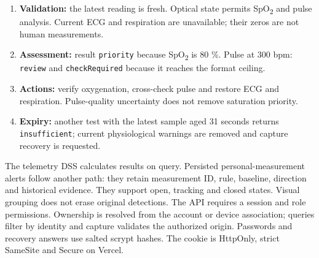 \begin{enumerate}[leftmargin=5mm,itemsep=5pt]
\item \textbf{Validation:} the latest reading is fresh. Optical state permits SpO\textsubscript{2} and pulse analysis. Current ECG and respiration are unavailable; their zeros are not human measurements.
\item \textbf{Assessment:} result \texttt{priority} because SpO\textsubscript{2} is 80 \%. Pulse at 300 bpm: \texttt{review} and \texttt{checkRequired} because it reaches the format ceiling.
\item \textbf{Actions:} verify oxygenation, cross-check pulse and restore ECG and respiration. Pulse-quality uncertainty does not remove saturation priority.
\item \textbf{Expiry:} another test with the latest sample aged 31 seconds returns \texttt{insufficient}; current physiological warnings are removed and capture recovery is requested.
\end{enumerate}
The telemetry DSS calculates results on query. Persisted personal-measurement alerts follow another path: they retain measurement ID, rule, baseline, direction and historical evidence. They support open, tracking and closed states. Visual grouping does not erase original detections.
The API requires a session and role permissions. Ownership is resolved from the account or device association; queries filter by identity and capture validates the authorized origin. Passwords and recovery answers use salted scrypt hashes. The cookie is HttpOnly, strict SameSite and Secure on Vercel.


